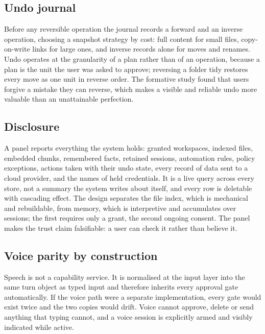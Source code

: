 \subsection{Undo journal}
Before any reversible operation the journal records a forward and an inverse operation, choosing a snapshot strategy by cost: full content for small files, copy-on-write links for large ones, and inverse records alone for moves and renames. Undo operates at the granularity of a plan rather than of an operation, because a plan is the unit the user was asked to approve; reversing a folder tidy restores every move as one unit in reverse order. The formative study found that users forgive a mistake they can reverse, which makes a visible and reliable undo more valuable than an unattainable perfection.

\subsection{Disclosure}
A panel reports everything the system holds: granted workspaces, indexed files, embedded chunks, remembered facts, retained sessions, automation rules, policy exceptions, actions taken with their undo state, every record of data sent to a cloud provider, and the names of held credentials. It is a live query across every store, not a summary the system writes about itself, and every row is deletable with cascading effect. The design separates the file index, which is mechanical and rebuildable, from memory, which is interpretive and accumulates over sessions; the first requires only a grant, the second ongoing consent. The panel makes the trust claim falsifiable: a user can check it rather than believe it.

\subsection{Voice parity by construction}
Speech is not a capability service. It is normalised at the input layer into the same turn object as typed input and therefore inherits every approval gate automatically. If the voice path were a separate implementation, every gate would exist twice and the two copies would drift. Voice cannot approve, delete or send anything that typing cannot, and a voice session is explicitly armed and visibly indicated while active.

